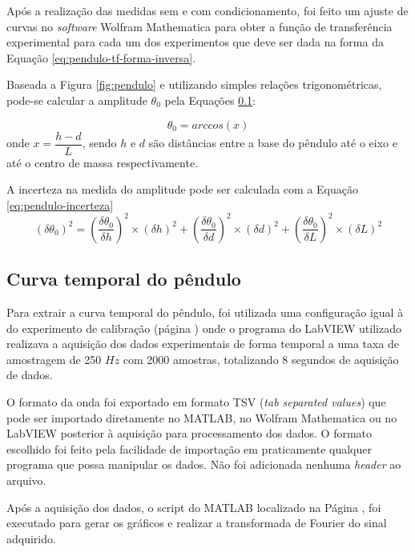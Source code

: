 \documentclass[a4paper]{instrumentacao}
\begin{document}
Após a realização das medidas sem e com condicionamento, foi feito um ajuste de curvas no \textit{software} Wolfram Mathematica para obter a função de transferência experimental para cada um dos experimentos que deve ser dada na forma da Equação \ref{eq:pendulo-tf-forma-inversa}.

Baseada  a Figura \ref{fig:pendulo} e  utilizando simples relações trigonométricas, pode-se calcular a amplitude $\theta_{0}$ pela Equações \ref{}:

\begin{equation}
	\theta_{0} = arccos(x)
	\label{eq:pendulo-angulo0}
\end{equation}
\noindent onde $x = \dfrac{h-d}{L}$, sendo $h$ e $d$ são distâncias entre a base do pêndulo até o eixo e até o centro de massa respectivamente.

A incerteza na medida do amplitude pode ser calculada com a Equação \ref{eq:pendulo-incerteza}
\begin{equation}
	(\delta\theta_{0})^2 = (\dfrac{\delta\theta_{0}}{\delta h})^2 \times (\delta h)^2 + (\dfrac{\delta\theta_{0}}{\delta d})^2 \times (\delta d)^2 + (\dfrac{\delta\theta_{0}}{\delta L})^2 \times (\delta L)^2
	\label{eq:pendulo-incerteza}
\end{equation}


\subsection{Curva temporal do pêndulo}

Para extrair a curva temporal do pêndulo, foi utilizada uma configuração igual à do experimento de calibração (página \pageref{sec:pendulo-calibracao-condicionado}) onde o programa do LabVIEW utilizado realizava a aquisição dos dados experimentais de forma temporal a uma taxa de amostragem de 250 $Hz$ com 2000 amostras, totalizando 8 segundos de aquisição de dados.

O formato da onda foi exportado em formato TSV (\textit{tab separated values}) que pode ser importado diretamente no MATLAB, no Wolfram Mathematica ou no LabVIEW posterior à aquisição para processamento dos dados. O formato escolhido foi feito pela facilidade de importação em praticamente qualquer programa que possa manipular os dados. Não foi adicionada nenhuma \textit{header} ao arquivo.

Após a aquisição dos dados, o script do MATLAB localizado na Página \pageref{att:script-matlab}, foi executado para gerar os gráficos e realizar a transformada de Fourier do sinal adquirido.
\end{document}
